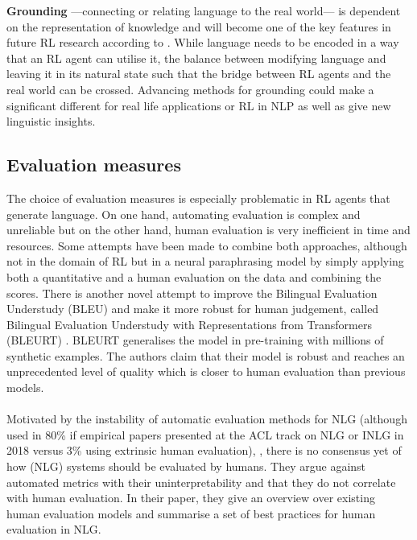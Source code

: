 \documentclass[11pt,a4paper]{article}
\begin{document}
\textbf{Grounding} ---connecting or relating language to the real world--- is dependent on the representation of knowledge and will become one of the key features in future RL research according to \citet{narasimhan-2018}. While language needs to be encoded in a way that an RL agent can utilise it, the balance between modifying language and leaving it in its natural state such that the bridge between RL agents and the real world can be crossed. Advancing methods for grounding could make a significant different for real life applications or RL in NLP as well as give new linguistic insights.

\subsection{Evaluation measures}
The choice of evaluation measures is especially problematic in RL agents that generate language. On one hand, automating evaluation is complex and unreliable but on the other hand, human evaluation is very inefficient in time and resources. Some attempts have been made to combine both approaches, although not in the domain of RL but in a neural paraphrasing model \citep{goyal-durrett-2020-neural} by simply applying both a quantitative and a human evaluation on the data and combining the scores. There is another novel attempt to improve the Bilingual Evaluation Understudy (BLEU) and make it more robust for human judgement, called Bilingual Evaluation Understudy with Representations from Transformers (BLEURT) \citep{papineni-etal-2002-bleu,sellam2020bleurt}. BLEURT generalises the model in pre-training with millions of synthetic examples. The authors claim that their model is robust and reaches an unprecedented level of quality which is closer to human evaluation than previous models.\\\\
Motivated by the instability of automatic evaluation methods for NLG (although used in 80\% if empirical papers presented at the ACL track on NLG or INLG in 2018 versus 3\% using extrinsic human evaluation), \citet{van-der-lee-etal-2019-best}, there is no consensus yet of how (NLG) systems should be evaluated by humans. They argue against automated metrics with their uninterpretability and that they do not correlate with human evaluation. In their paper, they give an overview over existing human evaluation models and summarise a set of best practices for human evaluation in NLG.\\\\
\end{document}
